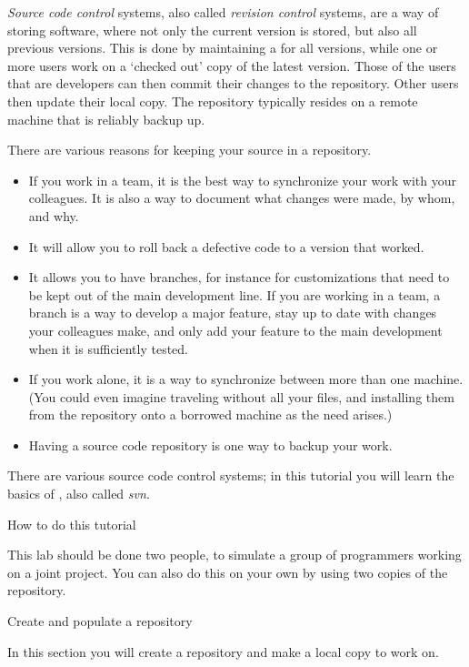 \emph{Source code control} systems, also
called \emph{revision control}  systems, are
a way of storing software, where not only the current version is
stored, but also all previous versions. 
This is done by maintaining a  for all versions,
while one or more users work on a `checked out' copy of the latest
version. Those of the users that are developers can then commit their
changes to the repository. Other users then update their local copy.
The repository typically resides on a remote machine that is reliably
backup up.

There are various reasons for keeping your source in a repository.
\begin{itemize}
\item If you work in a team, it is the best way to synchronize your
  work with your colleagues. It is also a way to document what changes
  were made, by whom, and why.
\item It will allow you to roll back a defective code to a version
  that worked.
\item It allows you to have branches, for instance for customizations
  that need to be kept out of the main development line. If you are
  working in a team, a branch is a way to develop a major feature, stay up
  to date with changes your colleagues make, and only add your feature
  to the main development when it is sufficiently tested.
\item If you work alone, it is a way to synchronize between more than
  one machine. (You could even imagine traveling without all your
  files, and installing them from the repository onto a borrowed
  machine as the need arises.)
\item Having a source code repository is one way to backup your work.
\end{itemize}

There are various source code control systems; in this tutorial you
will learn the basics of , also called
\emph{svn}.

 {How to do this tutorial}

This lab should be done two people, to simulate a group
of programmers working on a joint project. You can also do this on
your own by using two copies of the repository.

 {Create and populate a repository}

\begin{purpose}
  In this section you will create a repository and make a local copy
  to work on.
\end{purpose}

